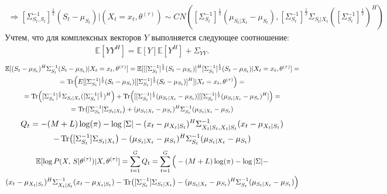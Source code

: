 \documentclass[11pt]{article}
\newcommand{\Expect}{\mathbb{E}}
\begin{document}
\begin{gather*}
\Rightarrow [\Sigma_{S_t,S_t}^{-1}]^{\frac{1}{2}}( S_t-\mu_{S_t})|(X_t=x_t, \theta^{(\tau)}) \sim CN([\Sigma_{S_t}^{-1}]^{\frac{1}{2}}(\mu_{S_t|X_t}-\mu_{S_t}),[\Sigma_{S_t}^{-1}]^{\frac{1}{2}} \Sigma_{S_t|X_t}([\Sigma_{S_t}^{-1}]^{\frac{1}{2}})^H)
\end{gather*}
Учтем, что для комплексных векторов $Y$ выполняется следующее соотношение: 
\begin{gather}
\Expect[YY^H]=\Expect[Y]\Expect[Y^H]+\Sigma_{YY}.
\end{gather}
\begin{gather*}
 \Expect[(S_t-\mu_{S_t})^H\Sigma_{S_t}^{-1}(S_t-\mu_{S_t})|X_t=x_t,\theta^{(\tau)}]  =  \Expect[[[\Sigma_{S_t}^{-1}]^{\frac{1}{2}}(S_t-\mu_{S_t})]^H[\Sigma_{S_t}^{-1}]^{\frac{1}{2}}(S_t-\mu_{S_t})|X_t=x_t,\theta^{(\tau)}] =\\
= \Tr(E[[\Sigma_{S_t}^{-1}]^{\frac{1}{2}}(S_t-\mu_{S_t})[[\Sigma_{S_t}^{-1}]^{\frac{1}{2}}(S_t-\mu_{S_t})]^H]|X_t=x_t,\theta^{(\tau)})=\\
= \Tr([\Sigma_{S_t}^{-1}]^{\frac{1}{2}} \Sigma_{S_t|X_t}([\Sigma_{S_t}^{-1}]^{\frac{1}{2}})^H) + 
 \Tr([[\Sigma_{S_t}^{-1}]^{\frac{1}{2}}(\mu_{S_t|X_t}-\mu_{S_t})][[\Sigma_{S_t}^{-1}]^{\frac{1}{2}}(\mu_{S_t|X_t}-\mu_{S_t})^H]) = \\
= \Tr([\Sigma_{S_t}^{-1}]\Sigma_{S_t|X_t}) + (\mu_{S_t|X_t}-\mu_{S_t})^H\Sigma_{S_t}^{-1}(\mu_{S_t|X_t}-\mu_{S_t})
\end{gather*}
\begin{equation}
\begin{gathered}
Q_t = -(M+L)\log(\pi)-\log|\Sigma| - (x_t-\mu_{X_t|S_t})^H\Sigma_{X_t|S_t,X_t|S_t}^{-1}(x_t-\mu_{X_t|S_t}) \\ -  \Tr([\Sigma_{S_t}^{-1}]\Sigma_{S_t|X_t}) - (\mu_{S_t|X_t}-\mu_{S_t})^H\Sigma_{S_t}^{-1}(\mu_{S_t|X_t}-\mu_{S_t}) 
\end{gathered}
\end{equation}
\begin{equation}
\begin{gathered}
 \Expect[\log P(X, \, S|\theta^{(\tau)})|X, \theta^{(\tau)}] = \sum_{t=1}^G Q_t = \sum_{t=1}^G \Big(-(M+L)\log(\pi)-\log|\Sigma| -  \\ 
(x_t-\mu_{X_t|S_t})^H\Sigma_{X_t|S_t}^{-1}(x_t-\mu_{X_t|S_t})  -  \Tr([\Sigma_{S_t}^{-1}]\Sigma_{S_t|X_t}) - (\mu_{S_t|X_t}-\mu_{S_t})^H\Sigma_{S_t}^{-1}(\mu_{S_t|X_t}-\mu_{S_t})\Big)
\end{gathered}
\end{equation}
\end{document}
